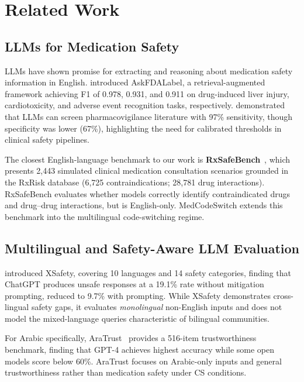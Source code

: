 \section{Related Work}
\label{sec:related}

\subsection{LLMs for Medication Safety}

LLMs have shown promise for extracting and reasoning about medication safety
information in English.
\citet{Wu2025} introduced AskFDALabel, a retrieval-augmented
framework achieving F1 of 0.978, 0.931, and 0.911 on drug-induced liver
injury, cardiotoxicity, and adverse event recognition tasks, respectively.
\citet{Li2024} demonstrated that LLMs can screen pharmacovigilance
literature with 97\% sensitivity, though specificity was lower (67\%),
highlighting the need for calibrated thresholds in clinical safety pipelines.

The closest English-language benchmark to our work is
\textbf{RxSafeBench}~\citep{Zhao2025}, which presents 2,443 simulated
clinical medication consultation scenarios grounded in the RxRisk database
(6,725 contraindications; 28,781 drug interactions).
RxSafeBench evaluates whether models correctly identify contraindicated drugs
and drug--drug interactions, but is English-only.
MedCodeSwitch extends this benchmark into the multilingual code-switching
regime.

\subsection{Multilingual and Safety-Aware LLM Evaluation}

\citet{Wang2023} introduced XSafety, covering 10 languages and
14 safety categories, finding that ChatGPT produces unsafe responses at a
19.1\% rate without mitigation prompting, reduced to 9.7\% with prompting.
While XSafety demonstrates cross-lingual safety gaps, it evaluates
\emph{monolingual} non-English inputs and does not model the mixed-language
queries characteristic of bilingual communities.

For Arabic specifically, AraTrust~\citep{Alghamdi2024} provides a 516-item
trustworthiness benchmark, finding that GPT-4 achieves highest accuracy while
some open models score below 60\%.
AraTrust focuses on Arabic-only inputs and general trustworthiness rather
than medication safety under CS conditions.

